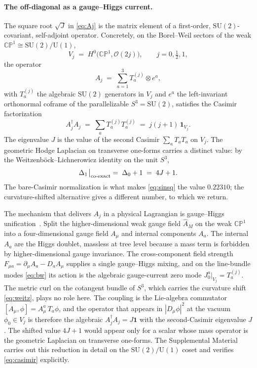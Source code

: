 \documentclass[aps,prl,twocolumn,superscriptaddress,floatfix,nofootinbib,reprint]{revtex4-2}
\newcommand{\half}{\tfrac12}
\newcommand{\SU}{\mathrm{SU}}
\newcommand{\U}{\mathrm{U}}
\newcommand{\CP}{\mathbb{CP}}
\begin{document}
\paragraph{The off-diagonal as a gauge--Higgs current.}
The square root $\sqrt{J}$ in \eqref{eq:Aj} is the matrix element of a
first-order, $\SU(2)$-covariant, self-adjoint operator.  Concretely, on
the Borel--Weil sectors of the weak $\CP^{1}\cong\SU(2)/\U(1)$,
\begin{equation}
  V_{j}\;=\;H^{0}\bigl(\CP^{1},\mathcal{O}(2j)\bigr),\qquad
  j=0,\half,1,
\label{eq:bw}
\end{equation}
the operator
\begin{equation}
  A_{j}\;=\;\sum_{a=1}^{3} T_{a}^{(j)}\otimes e^{a},
\label{eq:Aj-op}
\end{equation}
with $T_{a}^{(j)}$ the algebraic $\SU(2)$ generators in $V_{j}$ and
$e^{a}$ the left-invariant orthonormal coframe of the parallelizable
$S^{3}=\SU(2)$, satisfies the Casimir factorization
\begin{equation}
  A_{j}^{\dagger}A_{j}\;=\;\sum_{a}T_{a}^{(j)}T_{a}^{(j)}\;=\;j(j+1)\,\mathbf{1}_{V_{j}}.
\label{eq:casimir}
\end{equation}
The eigenvalue $J$ is the value of the second Casimir
$\sum_{a}T_{a}T_{a}$ on $V_{j}$.  The geometric Hodge Laplacian on
transverse one-forms carries a distinct value: by the
Weitzenb\"ock--Lichnerowicz identity on the unit $S^{3}$,
\begin{equation}
  \Delta_{1}\!\bigm|_{\text{co-exact}}\;=\;\Delta_{0}+1\;=\;4J+1.
\label{eq:weitz}
\end{equation}
The bare-Casimir normalization is what makes \eqref{eq:sinsq} the
value $0.22310$; the curvature-shifted alternative gives a different
number, to which we return.

The mechanism that delivers $A_{j}$ in a physical Lagrangian is
gauge--Higgs unification~\cite{Manton1979,Fairlie1979,Hosotani1983}.
Split the higher-dimensional weak gauge field $\hat A_{M}$ on the
weak $\CP^{1}$ into a four-dimensional gauge field $A_{\mu}$ and
internal components $A_{a}$.  The internal $A_{a}$ are the Higgs
doublet, massless at tree level because a mass term is forbidden by
higher-dimensional gauge invariance.  The cross-component field
strength $F_{\mu a}=\partial_{\mu}A_{a}-D_{a}A_{\mu}$ supplies a single
gauge--Higgs mixing, and on the line-bundle modes
\eqref{eq:bw} its action is the algebraic gauge-current zero mode
$J_{0}^{a}|_{V_{j}}=T_{a}^{(j)}$.  The metric curl on the cotangent
bundle of $S^{3}$, which carries the curvature shift
\eqref{eq:weitz}, plays no role here.  The coupling is the Lie-algebra
commutator
$[A_{\mu},\phi]=A_{\mu}^{a}\,T_{a}\phi$, and the operator that
appears in $|D_{\mu}\phi|^{2}$ at the vacuum $\phi_{0}\in V_{j}$ is
therefore the algebraic $A_{j}^{\dagger}A_{j}=J\mathbf{1}$ with the
second-Casimir eigenvalue $J$.  The shifted value $4J+1$ would appear
only for a scalar whose mass operator is the geometric Laplacian on
transverse one-forms.  The Supplemental Material carries out this
reduction in detail on the $\SU(2)/\U(1)$ coset and verifies
\eqref{eq:casimir} explicitly.
\end{document}
